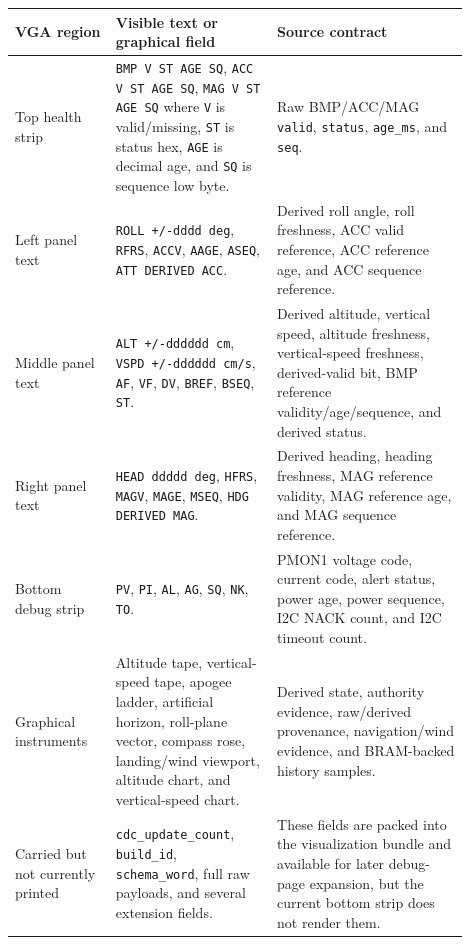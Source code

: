 \documentclass{article}
\newcommand{\sig}[1]{\begingroup\nolinkurl{#1}\endgroup}
\begin{document}
\begin{longtable}{p{0.20\linewidth} p{0.32\linewidth} p{0.38\linewidth}}
\toprule
\textbf{VGA region} & \textbf{Visible text or graphical field} & \textbf{Source contract} \\
\midrule
\endhead
Top health strip &
\sig{BMP V ST AGE SQ}, \sig{ACC V ST AGE SQ}, \sig{MAG V ST AGE SQ} where
\sig{V} is valid/missing, \sig{ST} is status hex, \sig{AGE} is decimal age, and
\sig{SQ} is sequence low byte. &
Raw BMP/ACC/MAG \sig{valid}, \sig{status}, \sig{age_ms}, and \sig{seq}. \\

Left panel text &
\sig{ROLL +/-dddd deg}, \sig{RFRS}, \sig{ACCV}, \sig{AAGE}, \sig{ASEQ},
\sig{ATT DERIVED ACC}. &
Derived roll angle, roll freshness, ACC valid reference, ACC reference age, and
ACC sequence reference. \\

Middle panel text &
\sig{ALT +/-dddddd cm}, \sig{VSPD +/-dddddd cm/s}, \sig{AF}, \sig{VF},
\sig{DV}, \sig{BREF}, \sig{BSEQ}, \sig{ST}. &
Derived altitude, vertical speed, altitude freshness, vertical-speed freshness,
derived-valid bit, BMP reference validity/age/sequence, and derived status. \\

Right panel text &
\sig{HEAD ddddd deg}, \sig{HFRS}, \sig{MAGV}, \sig{MAGE}, \sig{MSEQ},
\sig{HDG DERIVED MAG}. &
Derived heading, heading freshness, MAG reference validity, MAG reference age,
and MAG sequence reference. \\

Bottom debug strip &
\sig{PV}, \sig{PI}, \sig{AL}, \sig{AG}, \sig{SQ}, \sig{NK}, \sig{TO}. &
PMON1 voltage code, current code, alert status, power age, power sequence,
I2C NACK count, and I2C timeout count. \\

Graphical instruments &
Altitude tape, vertical-speed tape, apogee ladder, artificial horizon,
roll-plane vector, compass rose, landing/wind viewport, altitude chart, and
vertical-speed chart. &
Derived state, authority evidence, raw/derived provenance, navigation/wind
evidence, and BRAM-backed history samples. \\

Carried but not currently printed &
\sig{cdc_update_count}, \sig{build_id}, \sig{schema_word}, full raw payloads,
and several extension fields. &
These fields are packed into the visualization bundle and available for later
debug-page expansion, but the current bottom strip does not render them. \\
\bottomrule
\end{longtable}
\end{document}
